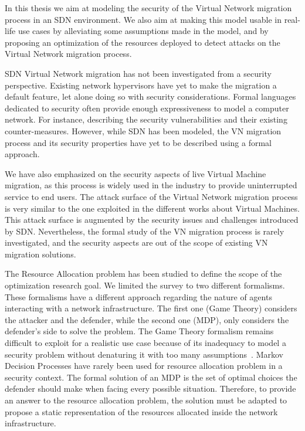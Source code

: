 In this thesis we aim at modeling the security of the Virtual Network migration process in an SDN environment.
We also aim at making this model usable in real-life use cases by alleviating some assumptions made in the model, and by proposing an optimization of the resources deployed to detect attacks on the Virtual Network migration process.

SDN Virtual Network migration has not been investigated from a security perspective.
Existing network hypervisors have yet to make the migration a default feature, let alone doing so with security considerations.
Formal languages dedicated to security often provide enough expressiveness to model a computer network. 
For instance, describing the security vulnerabilities and their existing counter-measures.
However, while SDN has been modeled, the VN migration process and its security properties have yet to be described using a formal approach.

We have also emphasized on the security aspects of live Virtual Machine migration, as this process is widely used in the industry to provide uninterrupted service to end users. 
The attack surface of the Virtual Network migration process is very similar to the one exploited in the different works about Virtual Machines. This attack surface is augmented by the security issues and challenges introduced by SDN. Nevertheless, the formal study of the VN migration process is rarely investigated, and the security aspects are out of the scope of existing VN migration solutions.


The Resource Allocation problem has been studied to define the scope of the optimization research goal.
We limited the survey to two different formalisms. These formalisms have a different approach regarding the nature of agents interacting with a network infrastructure. The first one (\ie Game Theory) considers the attacker and the defender, while the second one (\ie MDP), only considers the defender's side to solve the problem.
The Game Theory formalism remains difficult to exploit for a realistic use case because of its inadequacy to model a security problem without denaturing it with too many assumptions~\cite{Kiennert2018}.
Markov Decision Processes have rarely been used for resource allocation problem in a security context. The formal solution of an MDP is the set of optimal choices the defender should make when facing every possible situation. Therefore, to provide an answer to the resource allocation problem, the solution must be adapted to propose a static representation of the resources allocated inside the network infrastructure.

